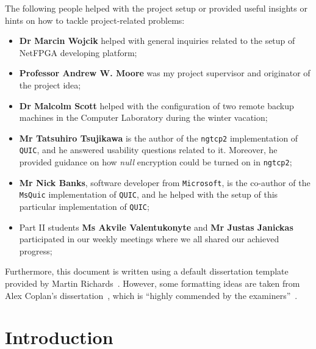 \documentclass[12pt,a4paper]{report}
\begin{document}
The following people helped with the project setup or provided useful insights or hints on how to tackle project-related problems:
\begin{itemize}
    \item \textbf{Dr Marcin Wojcik} helped with general inquiries related to the setup of NetFPGA developing platform;
    \item \textbf{Professor Andrew W. Moore} was my project supervisor and originator of the project idea;
    \item \textbf{Dr Malcolm Scott} helped with the configuration of two remote backup machines in the Computer Laboratory during the winter vacation;
    \item \textbf{Mr Tatsuhiro Tsujikawa} is the author of the \texttt{ngtcp2} implementation of \texttt{QUIC}, and he answered usability questions related to it. Moreover, he provided guidance on how \textit{null} encryption could be turned on in \texttt{ngtcp2};
    \item \textbf{Mr Nick Banks}, software developer from \texttt{Microsoft}, is the co-author of the \texttt{MsQuic} implementation of \texttt{QUIC}, and he helped with the setup of this particular implementation of \texttt{QUIC};
    \item Part II students \textbf{Ms Akvile Valentukonyte} and \textbf{Mr Justas Janickas} participated in our weekly meetings where we all shared our achieved progress;
\end{itemize}

Furthermore, this document is written using a default dissertation template provided by Martin Richards~\cite{how_to_write_a_dissertation_in_LATEX}.
However, some formatting ideas are taken from Alex Coplan's dissertation~\cite{Alex_Coplan_dissertation}, which is \enquote{highly commended by the examiners}~\cite{Computer_Lab_dissertations}.


\pagestyle{headings}

\chapter{Introduction}

%
\end{document}
